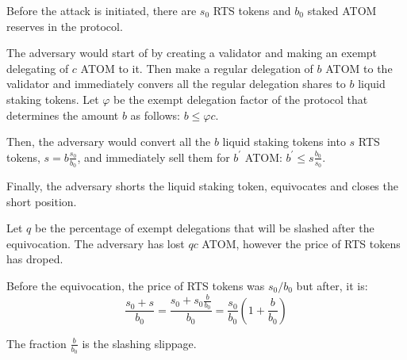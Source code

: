 Before the attack is initiated, there are $s_0$ RTS tokens and $b_0$
staked ATOM reserves in the protocol.

The adversary would start of by creating a validator and making an
exempt delegating of $c$ ATOM to it.
Then make a regular delegation of $b$ ATOM to the validator and
immediately convers all the regular delegation shares to $b$ liquid
staking tokens.
Let $\varphi$ be the exempt delegation factor of the protocol
that determines the amount $b$ as follows: $b \leq \varphi c$.

Then, the adversary would convert all the $b$ liquid staking tokens into
$s$ RTS tokens, $s = b \frac{s_0}{b_0}$, and immediately sell them for
$b^{'}$ ATOM: $b^{'} \leq s \frac{b_0}{s_0}$.

Finally, the adversary shorts the liquid staking token, equivocates
and closes the short position.

Let $q$ be the percentage of exempt delegations that will be slashed after
the equivocation. The adversary has lost $qc$ ATOM, however the price of RTS
tokens has droped.

Before the equivocation, the price of RTS tokens was $s_0/b_0$ but
after, it is:
\[
\frac{s_0 + s}{b_0} =
\frac{s_0 + s_0\frac{b}{b_0}}{b_0} =
\frac{s_0}{b_0} (1 + \frac{b}{b_0})
\]

The fraction $\frac{b}{b_0}$ is the slashing slippage.